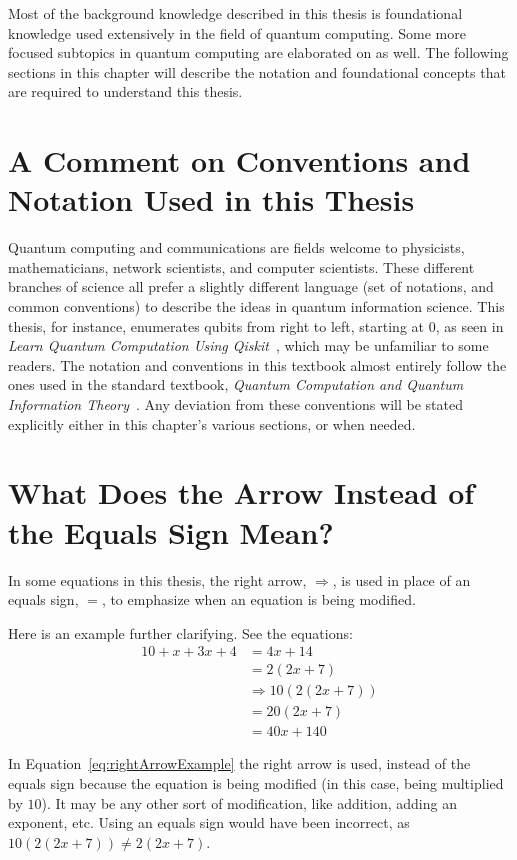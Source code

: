 Most of the background knowledge described in this thesis is foundational knowledge used extensively in the field of quantum computing. Some more focused subtopics in quantum computing are elaborated on as well. The following sections in this chapter will describe the notation and foundational concepts that are required to understand this thesis.
\section{A Comment on Conventions and Notation Used in this Thesis}
Quantum computing and communications are fields welcome to physicists, mathematicians, network scientists, and computer scientists. These different branches of science all prefer a slightly different language (set of notations, and common conventions) to describe the ideas in quantum information science. This thesis, for instance, enumerates qubits from right to left, starting at 0, as seen in \emph{Learn Quantum Computation Using Qiskit}~\cite{Qiskit-Textbook}, which may be unfamiliar to some readers. The notation and conventions in this textbook almost entirely follow the ones used in the standard textbook, \emph{Quantum Computation and Quantum Information Theory}~\cite{nielsen2002quantum}. Any deviation from these conventions will be stated explicitly either in this chapter's various sections, or when needed.
\section{What Does the Arrow Instead of the Equals Sign Mean?}
\label{sec:whatDoesTheArrowInsteadOfEqualsSignMean}
In some equations in this thesis, the right arrow, $\Rightarrow$, is used in place of an equals sign, $=$, to emphasize when an equation is being modified.
\begin{example}
Here is an example further clarifying. See the equations:
\begin{align}
10 + x + 3x + 4 &= 4x + 14\\
&=2(2x + 7)\\
&\Rightarrow 10(2(2x + 7))\label{eq:rightArrowExample}\\
&= 20(2x + 7)\\
&=40x + 140
\end{align}
\end{example}
In Equation~\eqref{eq:rightArrowExample} the right arrow is used, instead of the equals sign because the equation is being modified (in this case, being multiplied by $10$). It may be any other sort of modification, like addition, adding an exponent, etc. Using an equals sign would have been incorrect, as $10(2(2x + 7)) \neq 2(2x + 7)$.
